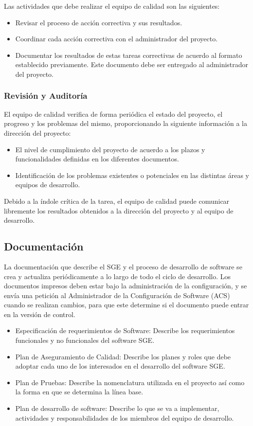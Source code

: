 \documentclass[a4paper,10pt]{article}
\begin{document}
	Las actividades que debe realizar el equipo de calidad son las siguientes:
	\begin{itemize}
		\item Revisar el proceso de acción correctiva y sus resultados.
		\item Coordinar cada acción correctiva con el administrador del proyecto.
		\item Documentar los resultados de estas tareas correctivas de acuerdo al formato establecido previamente. Este documento debe ser entregado al administrador del proyecto.
	\end{itemize}
	
	\subsubsection{Revisión y Auditoría}
	El equipo de calidad verifica de forma periódica el estado del proyecto, el progreso y los problemas del mismo, proporcionando la siguiente información a la dirección del proyecto:
	
	\begin{itemize}
		\item El nivel de cumplimiento del proyecto de acuerdo a los plazos y funcionalidades definidas en los diferentes documentos.
		\item Identificación de los problemas existentes o potenciales en las distintas áreas y equipos de desarrollo.
	\end{itemize}
	
	Debido a la índole crítica de la tarea, el equipo de calidad puede comunicar libremente los resultados obtenidos a la dirección del proyecto y al equipo de desarrollo.
	
	\subsection{Documentación}
	La documentación que describe el SGE y el proceso de desarrollo de software se crea y actualiza periódicamente a lo largo de todo el ciclo de desarrollo. Los documentos impresos deben estar bajo la administración de la configuración, y se envía una petición al Administrador de la Configuración de Software (ACS) cuando se realizan cambios, para que este determine si el documento puede entrar en la versión de control.
	
	\begin{itemize}
		\item Especificación de requerimientos de Software: Describe los requerimientos funcionales y no funcionales del software SGE.
		\item Plan de Aseguramiento de Calidad: Describe los planes y roles que debe adoptar cada uno de los interesados en el desarrollo del software SGE.
		\item Plan de Pruebas: Describe la nomenclatura utilizada en el proyecto así como la forma en que se determina la línea base.
		\item Plan de desarrollo de software: Describe lo que se va a implementar, actividades y responsabilidades de los miembros del equipo de desarrollo.
	\end{itemize}
	
\end{document}

